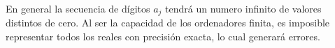 \begin{obs}
    En general la secuencia de dígitos $a_j$ tendrá un numero infinito de valores distintos de cero. Al ser la capacidad de los ordenadores finita, es imposible representar todos los reales con precisión exacta, lo cual generará errores.
\end{obs}

\begin{comment}
    \begin{definition}
            La representación normalizada (única) en coma flotante de $x \in \R$ en base $b$ con dígitos $(d_n)_{n \in Z^{+}}$ i exponente $e \in \Z$ es:
            \[
                    x = \pm 0.d_1d_2... \cdot b^e \nonumber
            \]
            Con la restricción de que $d_1 \neq 0$
    \end{definition}

    \begin{example}
            La representación normalizada de $172.456$ en base $10$ es $\SI{0.172456e3}{}$
    \end{example}

    \begin{definition}
            La representación en coma flotante con $n$ dígitos de un numero real $x$ con representación normalizada $x = \pm 0d_1..d_n... \cdot b^e$ es:
            \begin{itemize}
                    \item  $\fl$ por truncado:
                    \[
                            \fl_T(x) = \pm 0.d_1..d_n \cdot b^e \nonumber
                    \]
                    \item $\fl$ por redondeo:
                            \[
                            \fl(x) = \left.
                            \begin{cases}
                            \pm 0.d_1..d_n \cdot b^e & 0 \leq d_n < \frac{b}{2} \\
                            \pm (0.d_1..d_n + b^{-n}) \cdot b^e & \frac{b}{2} \leq x < b
                            \end{cases}
                            \right.
                            \]
            \end{itemize}
    \end{definition}

    Supongamos que queremos almacenar $\fl(x)$ con la siguiente estructura (en base $b = 2$):
    
    \[
            \underbrace{[*]}_{s_1}
            \hspace{0.1cm}
            \underbrace{[{}*|*|*|*|*|*|*{}]}_{d_1,...,d_n}
            \hspace{0.1cm}
            \underbrace{[*]}_{s_2}
            \hspace{0.1cm}
            \underbrace{[{}*|*|*|*|*{}]}_{e_1,..,e_k}
            \nonumber
    \]
    

\end{comment}
